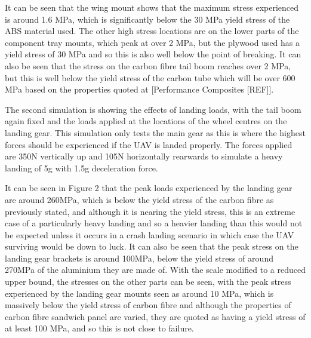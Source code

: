 \documentclass[../../main.tex]{subfiles}
\begin{document}

It can be seen that the wing mount shows that the maximum stress experienced is around 1.6 MPa, which is significantly below the 30 MPa yield stress of the ABS material used.
The other high stress locations are on the lower parts of the component tray mounts, which peak at over 2 MPa, but the plywood used has a yield stress of 30 MPa and so this is also well below the point of breaking.
It can also be seen that the stress on the carbon fibre tail boom reaches over 2 MPa, but this is well below the yield stress of the carbon tube which will be over 600 MPa based on the properties quoted at [Performance Composites [REF]]. 

The second simulation is showing the effects of landing loads, with the tail boom again fixed and the loads applied at the locations of the wheel centres on the landing gear.
This simulation only tests the main gear as this is where the highest forces should be experienced if the UAV is landed properly.
The forces applied are 350N vertically up and 105N horizontally rearwards to simulate a heavy landing of 5g with 1.5g deceleration force. 


It can be seen in Figure 2 that the peak loads experienced by the landing gear are around 260MPa, which is below the yield stress of the carbon fibre as previously stated, and although it is nearing the yield stress, this is an extreme case of a particularly heavy landing and so a heavier landing than this would not be expected unless it occurs in a crash landing scenario in which case the UAV surviving would be down to luck.
It can also be seen that the peak stress on the landing gear brackets is around 100MPa, below the yield stress of around 270MPa of the aluminium they are made of.
With the scale modified to a reduced upper bound, the stresses on the other parts can be seen, with the peak stress experienced by the landing gear mounts seen as around 10 MPa, which is massively below the yield stress of carbon fibre and although the properties of carbon fibre sandwich panel are varied, they are quoted as having a yield stress of at least 100 MPa, and so this is not close to failure. 
\end{document}
